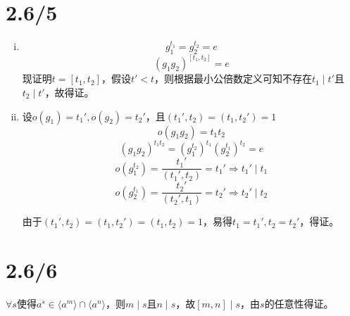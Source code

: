 \documentclass{article}
\begin{document}
\section{2.6/5}
\begin{enumerate}[(i)]
\item
$$g_1^{t_1}=g_2^{t_2}=e$$
$$(g_1g_2)^{[t_1,t_2]}=e$$
现证明$t=[t_1,t_2]$，假设$t'<t$，则根据最小公倍数定义可知不存在$t_1\mid t'$且$t_2\mid t'$，故得证。
\item
设$o(g_1)=t_1',o(g_2)=t_2'$，且$(t_1',t_2)=(t_1,t_2')=1$
$$o(g_1g_2)=t_1t_2$$
$$(g_1g_2)^{t_1t_2}=(g_1^{t_2})^{t_1}(g_2^{t_1})^{t_2}=e$$
$$o(g_1^{t_2})=\frac{t_1'}{(t_1',t_2)}=t_1'\Longrightarrow t_1'\mid t_1$$
$$o(g_2^{t_1})=\frac{t_2'}{(t_2',t_1)}=t_2'\Longrightarrow t_2'\mid t_2$$

由于$(t_1',t_2)=(t_1,t_2')=(t_1,t_2)=1$，易得$t_1=t_1',t_2=t_2'$，得证。

\end{enumerate}

\section{2.6/6}
$\forall s$使得$a^s\in\langle a^m\rangle\cap\langle a^n\rangle$，则$m\mid s$且$n\mid s$，故$[m,n]\mid s$，由$s$的任意性得证。
\end{document}
